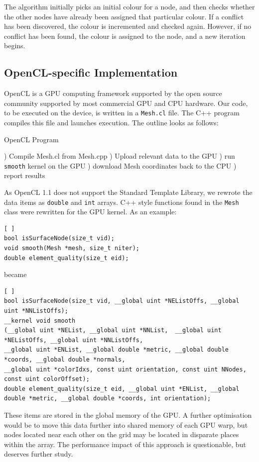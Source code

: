 \documentclass[a4paper,12pt, twocolumn]{article}
\begin{document}
The algorithm initially picks an initial colour for a node, and then checks whether the other nodes have already been assigned that particular colour. If a conflict has been discovered, the colour is incremented and checked again. However, if no conflict has been found, the colour is assigned to the node, and a new iteration begins.

\subsection{OpenCL-specific Implementation}
OpenCL is a GPU computing framework supported by the open source community supported by most commercial GPU and CPU hardware.
Our code, to be executed on the device, is written in a \verb+Mesh.cl+ file.
The C++ program compiles this file and launches execution.  The outline looks as follows:
\begin{algorithm}[H]
\caption{OpenCL Program}
\label{al:colour}
\begin{algorithmic}[1]
) Compile Mesh.cl from Mesh.cpp
) Upload relevant data to the GPU
) run \verb+smooth+ kernel on the GPU
) download Mesh coordinates back to the CPU
) report results
\end{algorithmic}
\end{algorithm}
As OpenCL 1.1 does not support the Standard Template Library, we rewrote the data items as \verb+double+ and \verb+int+ arrays.  C++ style functions found in the \verb+Mesh+ class were rewritten for the GPU kernel.  As an example:
\begin{lstlisting}[ ]
bool isSurfaceNode(size_t vid);
void smooth(Mesh *mesh, size_t niter);
double element_quality(size_t eid);
\end{lstlisting}

became

\begin{lstlisting}[ ]
bool isSurfaceNode(size_t vid, __global uint *NEListOffs, __global uint *NNListOffs);
__kernel void smooth
(__global uint *NEList, __global uint *NNList,  __global uint *NEListOffs, __global uint *NNListOffs,
__global uint *ENList, __global double *metric, __global double *coords, __global double *normals,
__global uint *colorIdxs, const uint orientation, const uint NNodes, const uint colorOffset);
double element_quality(size_t eid, __global uint *ENList, __global double *metric, __global double *coords, int orientation);
\end{lstlisting}
These items are stored in the global memory of the GPU.  A further optimisation would be to move this data further into shared memory of each GPU warp, but nodes located near each other on the grid may be located in disparate places within the array.  The performance impact of this approach is questionable, but deserves further study.
\end{document}
